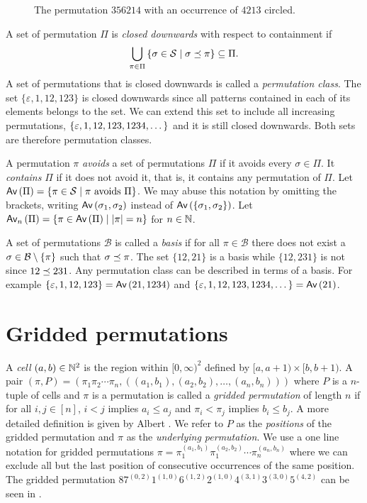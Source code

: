 \begin{figure}[ht!]
    \centering
    
    \caption{The permutation $356214$ with an occurrence of $4213$ circled.}
    \label{fig:pattern_containment}
\end{figure}

A set of permutation $\Pi$ is \emph{closed downwards} with respect to containment if 
\[
    \bigcup_{\pi \in \Pi}\cset{\sigma \in \mathcal{S}}{\contains{\pi}{\sigma}} \subseteq \Pi.
\]
A set of permutations that is closed downwards is called a \emph{permutation class}. The set $\{\varepsilon, 1, 12, 123\}$ is closed downwards since all patterns contained in each of its elements belongs to the set. We can extend this set to include all increasing permutations, $\set{\varepsilon, 1, 12, 123, 1234, \dotsc}$ and it is still closed downwards. Both sets are therefore permutation classes.

A permutation $\pi$ \emph{avoids} a set of permutations $\Pi$ if it avoids every $\sigma \in \Pi$. It \emph{contains} $\Pi$ if it does not avoid it, that is, it contains any permutation of $\Pi$. Let $\Av{\Pi} = \cset{\pi \in \mathcal{S}}{\pi \text{ avoids } \Pi}$. We may abuse this notation by omitting the brackets, writing $\Av{\sigma_1,\sigma_2}$ instead of $\Av{\set{\sigma_1,\sigma_2}}$. Let $\textsf{Av}_n\left(\Pi\right) = \cset{\pi \in \Av{\Pi}}{|\pi| = n}$ for $n\in\N$.

A set of permutations $\mathcal{B}$ is called a \emph{basis} if for all $\pi\in\mathcal{B}$ there does not exist a $\sigma \in \mathcal{B} \setminus \set{\pi}$ such that $\contains{\pi}{\sigma}$. The set $\{12,21\}$ is a basis while $\{12,231\}$ is not since $\contains{231}{12}$. Any permutation class can be described in terms of a basis. For example $\{\varepsilon,1,12,123\} = \Av{21, 1234}$ and $\{\varepsilon, 1, 12, 123, 1234,\dotsc\} = \Av{21}$.


\section{Gridded permutations\label{sec:griddedpermutations}}
A \emph{cell} $(a,b) \in \N^2$ is the region within $[0,\infty)^2$ defined by $[a, a+1) \times [b, b+1).$ A pair $(\pi,P) = (\pi_1\pi_2\dotsb\pi_n, ((a_1,b_1),(a_2,b_2),\dotsc,(a_n,b_n)))$ where $P$ is a $n$-tuple of cells and $\pi$ is a permutation is called a \emph{gridded permutation} of length $n$ if for all $i,j \in [n]$, $i<j$ implies $a_i \leq a_j$ and $\pi_i < \pi_j$ implies $b_i \leq b_j$. A more detailed definition is given by Albert \cite{albert2012geometric}. We refer to $P$ as the \emph{positions} of the gridded permutation and $\pi$ as the \emph{underlying permutation}. We use a one line notation for gridded permutations $\pi = \pi_1^{(a_1,b_1)}\pi_1^{(a_2,b_2)}\dotsb\pi_n^{(a_n,b_n)}$ where we can exclude all but the last position of consecutive occurrences of the same position. The gridded permutation $87^{(0,2)}1^{(1,0)}6^{(1,2)}2^{(1,0)}4^{(3,1)}3^{(3,0)}5^{(4,2)}$ can be seen in .

